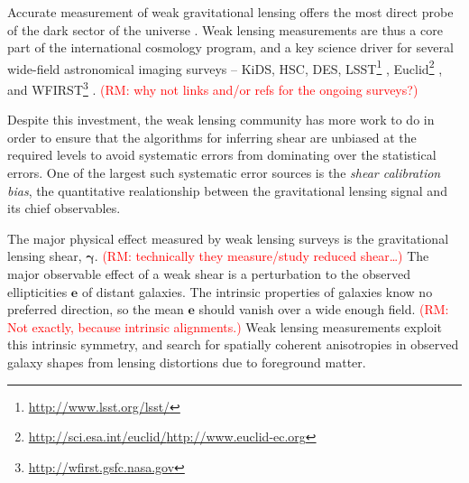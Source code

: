\documentclass[iop]{emulateapj}
\newcommand\rmcomment[1]{\textcolor{red}{(RM: #1)}}
\begin{document}
Accurate measurement of weak gravitational lensing offers the most
direct probe of the dark sector of the universe
\citep[e.g.,][]{2001PhR...340..291B,2003ARA&A..41..645R,schneider06,2008ARNPS..58...99H,2010RPPh...73h6901M,2013PhR...530...87W}.
Weak lensing measurements are thus a core part of the international
cosmology program, and a key science driver for several wide-field
astronomical imaging surveys -- KiDS, HSC, DES, 
LSST\footnote{\url{http://www.lsst.org/lsst/}} \citep{2009arXiv0912.0201L},
Euclid\footnote{\url{http://sci.esa.int/euclid/}\url{http://www.euclid-ec.org}}
\citep{2011arXiv1110.3193L}, and 
WFIRST\footnote{\url{http://wfirst.gsfc.nasa.gov}} 
\citep{2015arXiv150303757S}.
\rmcomment{why not links and/or refs for the ongoing surveys?}

Despite this investment, the weak lensing community has more work to do in order to ensure that the
algorithms for inferring shear are unbiased at the required levels to avoid systematic errors from
dominating over the statistical errors.
One of the largest such systematic error
sources is the {\it shear calibration bias}, the quantitative
realationship between the gravitational lensing signal and its chief
observables.

The major physical effect measured by weak lensing surveys is the
gravitational lensing shear, $\boldsymbol{\gamma}$. \rmcomment{technically they measure/study
  reduced shear\dots} The major observable
effect of a weak shear is a perturbation to the observed ellipticities
$\boldsymbol{e}$ of distant galaxies. The intrinsic properties of
galaxies know no preferred direction, so the mean $\boldsymbol{e}$
should vanish over a wide enough field. \rmcomment{Not exactly, because intrinsic alignments.}  
Weak lensing measurements
exploit this intrinsic symmetry, and search for spatially coherent
anisotropies in observed galaxy shapes from lensing distortions due to
foreground matter.
\end{document}
